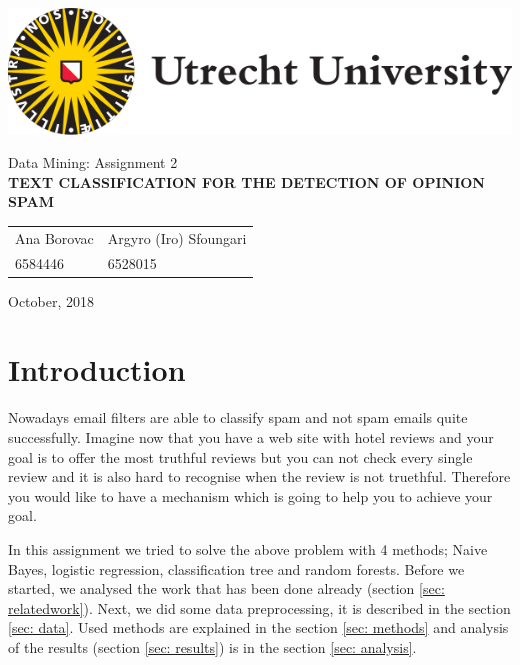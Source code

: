 \documentclass[a4paper,11pt]{article}
\begin{document}
\thispagestyle{empty}

\includegraphics[scale=0.35]{UUlogo.png}

\vspace{50mm}

\begin{center}
\begin{large}
Data Mining: Assignment 2 \\[3mm]
\textbf{
\uppercase{Text Classification for the Detection of Opinion Spam}} \\[25mm]
\end{large}

\begin{tabularx}{\textwidth}{YY}
Ana Borovac & Argyro (Iro) Sfoungari \\
6584446 & 6528015
\end{tabularx}
\end{center}

\vfill

October, 2018

\newpage

\tableofcontents

\vspace{3cm}

\begin{abstract}
\end{abstract}

\newpage

\section{Introduction}
Nowadays email filters are able to classify spam and not spam emails quite successfully. Imagine now that you have a web site with hotel reviews and your goal is to offer the most truthful reviews but you can not check every single review and it is also hard to recognise when the review is not truethful. Therefore you would like to have a mechanism which is going to help you to achieve your goal. 

In this assignment we tried to solve the above problem with 4 methods; Naive Bayes, logistic regression, classification tree and random forests. Before we started, we analysed the work that has been done already (section \ref{sec: relatedwork}). Next, we did some data preprocessing, it is described in the section \ref{sec: data}. Used methods are explained in the section \ref{sec: methods} and analysis of the results (section \ref{sec: results}) is in the section \ref{sec: analysis}.
\end{document}
